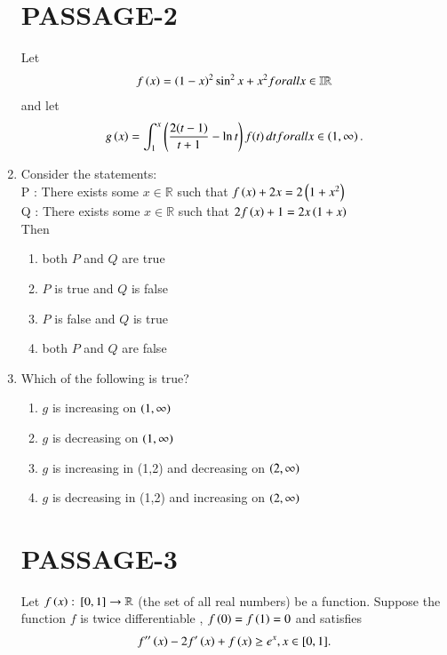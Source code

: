 \documentclass[journal,,12pt,onecolumn]{IEEEtran}
\theoremstyle{remark}
\begin{document}
\begin{enumerate}
\section*{PASSAGE-2}
Let \begin{align}f\left(x\right)=\left(1-x\right)^2 \sin^2 x + x^2 for all x \in \mathbb{IR} \end{align} and let \begin{align}g\left(x\right)=
\int_{1}^{x} \left(\frac{2(t-1)}{t+1} - \ln t\right)  f(t) \, dt for all x \in \left(1 ,\infty\right).\end{align}
\item Consider the statements:\\
P : There exists some $x \in \mathbb{R}$ such that $f\left(x\right) + 2x = 2\left(1+x^2\right)$\\
Q : There exists some $x \in\mathbb{R}$ such that $2f\left(x\right) + 1 = 2x\left(1+x\right)$\\
    Then
    \hfill{}
\begin{enumerate}
\item both $P$ and $Q$ are true
\item $P$ is true and $Q$ is false
\item $P$ is false and $Q$ is true
\item both $P$ and $Q$ are false
\end{enumerate}



\item Which of the following is true?
\hfill{}
\begin{enumerate}

\item $g$ is increasing on $\left(1,\infty\right)$
\item $g$ is decreasing on $\left(1,\infty\right)$
\item $g$ is increasing in (1,2) and decreasing on $\left(2,\infty\right)$
\item $g$ is decreasing in (1,2) and increasing on $\left(2,\infty\right)$

\end{enumerate}


\section*{PASSAGE-3}
Let $f\left(x\right) : {}\left[0,1\right] \to\mathbb{R}$
(the set of all real numbers) be a function. Suppose the function $f$ is twice differentiable , $f\left(0\right)=f\left(1\right)=0$ and satisfies \begin{align} f''\left(x\right)-2f'\left(x\right)+f\left(x\right) \geq e^x , x \in [0,1].\end{align} 


\end{enumerate}
\end{document}
